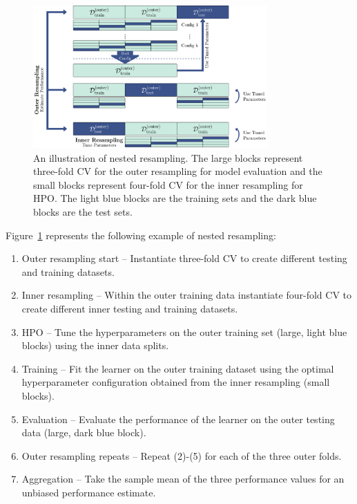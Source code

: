 \begin{figure}

{\centering \includegraphics[width=0.8\textwidth,height=\textheight]{chapters/chapter4/Figures/mlr3book_figures-11.png}

}

\caption{\label{fig-nested-resampling}An illustration of nested
resampling. The large blocks represent three-fold CV for the outer
resampling for model evaluation and the small blocks represent four-fold
CV for the inner resampling for HPO. The light blue blocks are the
training sets and the dark blue blocks are the test sets.}

\end{figure}

Figure~\ref{fig-nested-resampling} represents the following example of
nested resampling:

\begin{enumerate}
\def\labelenumi{\arabic{enumi}.}
\tightlist
\item
  Outer resampling start -- Instantiate three-fold CV to create
  different testing and training datasets.
\item
  Inner resampling -- Within the outer training data instantiate
  four-fold CV to create different inner testing and training datasets.
\item
  HPO -- Tune the hyperparameters on the outer training set (large,
  light blue blocks) using the inner data splits.
\item
  Training -- Fit the learner on the outer training dataset using the
  optimal hyperparameter configuration obtained from the inner
  resampling (small blocks).
\item
  Evaluation -- Evaluate the performance of the learner on the outer
  testing data (large, dark blue block).
\item
  Outer resampling repeats -- Repeat (2)-(5) for each of the three outer
  folds.
\item
  Aggregation -- Take the sample mean of the three performance values
  for an unbiased performance estimate.
\end{enumerate}


